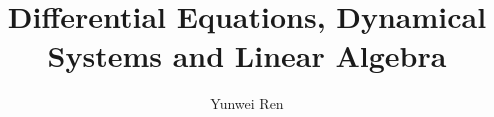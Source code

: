 

\title{Differential Equations, Dynamical Systems and Linear Algebra}
\author{Yunwei Ren}
\date{}


\maketitle
\tableofcontents

\newpage



